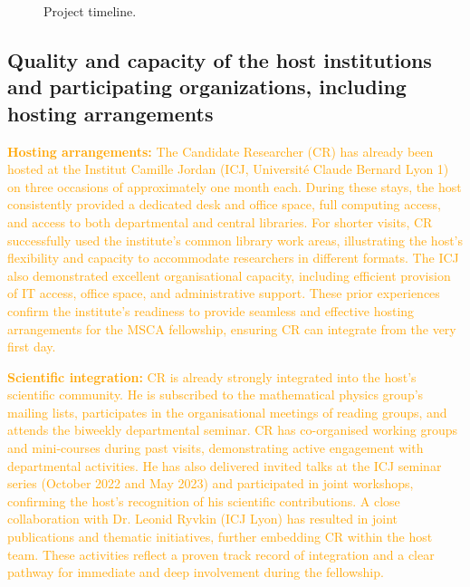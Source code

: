 \documentclass[11pt,draftproposal]{msca-pf}
\begin{document}
\begin{figure}[htbp]
  \centering
  
  \caption{Project timeline.}
  \label{fig:gantt}
\end{figure}


\subsection{Quality and capacity of the host institutions and participating
organizations, including hosting arrangements}
\label{ssc:implementation: host}

\textcolor{orange}{\textbf{Hosting arrangements:} The Candidate Researcher (CR) has already been hosted at the Institut Camille Jordan (ICJ, Université Claude Bernard Lyon 1) on three occasions of approximately one month each. During these stays, the host consistently provided a dedicated desk and office space, full computing access, and access to both departmental and central libraries. For shorter visits, CR successfully used the institute’s common library work areas, illustrating the host’s flexibility and capacity to accommodate researchers in different formats. The ICJ also demonstrated excellent organisational capacity, including efficient provision of IT access, office space, and administrative support. These prior experiences confirm the institute’s readiness to provide seamless and effective hosting arrangements for the MSCA fellowship, ensuring CR can integrate from the very first day.}

\textcolor{orange}{\textbf{Scientific integration:} CR is already strongly integrated into the host’s scientific community. He is subscribed to the mathematical physics group’s mailing lists, participates in the organisational meetings of reading groups, and attends the biweekly departmental seminar. CR has co-organised working groups and mini-courses during past visits, demonstrating active engagement with departmental activities. He has also delivered invited talks at the ICJ seminar series (October 2022 and May 2023) and participated in joint workshops, confirming the host’s recognition of his scientific contributions. A close collaboration with Dr. Leonid Ryvkin (ICJ Lyon) has resulted in joint publications and thematic initiatives, further embedding CR within the host team. These activities reflect a proven track record of integration and a clear pathway for immediate and deep involvement during the fellowship.}
\end{document}
